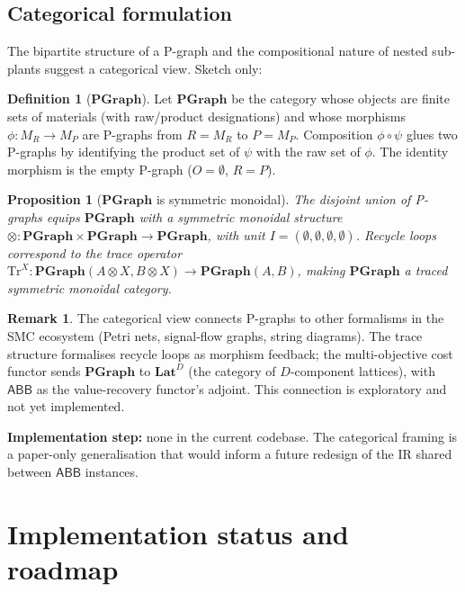 \documentclass[11pt,a4paper]{article}
\theoremstyle{plain}
\newtheorem{proposition}[theorem]{Proposition}
\theoremstyle{definition}
\newtheorem{definition}[theorem]{Definition}
\newtheorem{remark}[theorem]{Remark}
\newcommand{\abb}{\textsf{ABB}}
\begin{document}
\subsection{Categorical formulation}

The bipartite structure of a P-graph and the compositional nature
of nested sub-plants suggest a categorical view. Sketch only:

\begin{definition}[$\mathbf{PGraph}$]
Let $\mathbf{PGraph}$ be the category whose objects are finite
sets of materials (with raw/product designations) and whose
morphisms $\phi : M_R \to M_P$ are P-graphs from $R = M_R$ to
$P = M_P$. Composition $\phi \circ \psi$ glues two P-graphs by
identifying the product set of $\psi$ with the raw set of $\phi$.
The identity morphism is the empty P-graph
($O = \emptyset$, $R = P$).
\end{definition}

\begin{proposition}[$\mathbf{PGraph}$ is symmetric monoidal]
The disjoint union of P-graphs equips $\mathbf{PGraph}$ with a
symmetric monoidal structure
$\otimes : \mathbf{PGraph} \times \mathbf{PGraph} \to \mathbf{PGraph}$,
with unit $I = (\emptyset, \emptyset, \emptyset, \emptyset)$. Recycle
loops correspond to the trace operator
$\mathrm{Tr}^X : \mathbf{PGraph}(A \otimes X, B \otimes X) \to \mathbf{PGraph}(A, B)$,
making $\mathbf{PGraph}$ a traced symmetric monoidal category.
\end{proposition}

\begin{remark}
The categorical view connects P-graphs to other formalisms in the
SMC ecosystem (Petri nets, signal-flow graphs, string diagrams).
The trace structure formalises recycle loops as morphism feedback;
the multi-objective cost functor sends $\mathbf{PGraph}$ to
$\mathbf{Lat}^D$ (the category of $D$-component lattices), with
$\abb$ as the value-recovery functor's adjoint. This connection
is exploratory and not yet implemented.
\end{remark}

\textbf{Implementation step:} none in the current codebase. The
categorical framing is a paper-only generalisation that would
inform a future redesign of the IR shared between $\abb$ instances.

\section{Implementation status and roadmap}
\label{sec:status}
\end{document}
